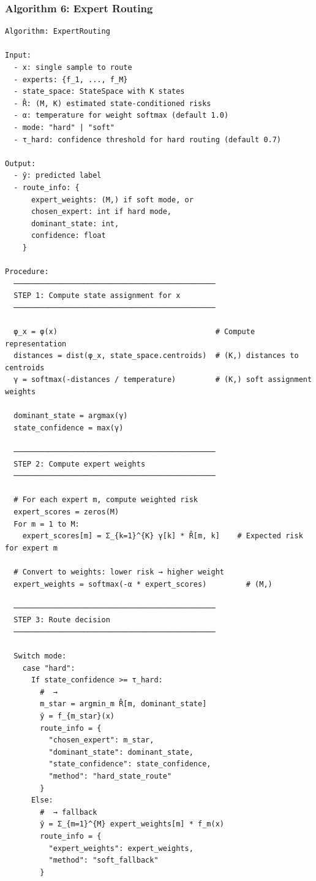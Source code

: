 \documentclass[
  12pt,
]{article}
\begin{document}
\subsubsection{Algorithm 6: Expert
Routing}\label{algorithm-6-expert-routing}

\begin{verbatim}
Algorithm: ExpertRouting

Input:
  - x: single sample to route
  - experts: {f_1, ..., f_M}
  - state_space: StateSpace with K states
  - R̂: (M, K) estimated state-conditioned risks
  - α: temperature for weight softmax (default 1.0)
  - mode: "hard" | "soft"
  - τ_hard: confidence threshold for hard routing (default 0.7)

Output:
  - ŷ: predicted label
  - route_info: {
      expert_weights: (M,) if soft mode, or
      chosen_expert: int if hard mode,
      dominant_state: int,
      confidence: float
    }

Procedure:
  ──────────────────────────────────────────────
  STEP 1: Compute state assignment for x
  ──────────────────────────────────────────────

  φ_x = φ(x)                                    # Compute representation
  distances = dist(φ_x, state_space.centroids)  # (K,) distances to centroids
  γ = softmax(-distances / temperature)         # (K,) soft assignment weights

  dominant_state = argmax(γ)
  state_confidence = max(γ)

  ──────────────────────────────────────────────
  STEP 2: Compute expert weights
  ──────────────────────────────────────────────

  # For each expert m, compute weighted risk
  expert_scores = zeros(M)
  For m = 1 to M:
    expert_scores[m] = Σ_{k=1}^{K} γ[k] * R̂[m, k]    # Expected risk for expert m

  # Convert to weights: lower risk → higher weight
  expert_weights = softmax(-α * expert_scores)         # (M,)

  ──────────────────────────────────────────────
  STEP 3: Route decision
  ──────────────────────────────────────────────

  Switch mode:
    case "hard":
      If state_confidence >= τ_hard:
        #  → 
        m_star = argmin_m R̂[m, dominant_state]
        ŷ = f_{m_star}(x)
        route_info = {
          "chosen_expert": m_star,
          "dominant_state": dominant_state,
          "state_confidence": state_confidence,
          "method": "hard_state_route"
        }
      Else:
        #  → fallback
        ŷ = Σ_{m=1}^{M} expert_weights[m] * f_m(x)
        route_info = {
          "expert_weights": expert_weights,
          "method": "soft_fallback"
        }


\end{verbatim}
\end{document}
